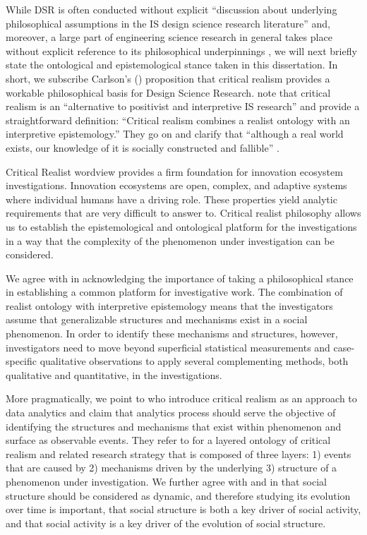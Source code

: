 While DSR is often conducted without explicit ``discussion about underlying philosophical assumptions in the IS design science research literature'' \cite{Carlsson2010DesignApproach} and, moreover, a large part of engineering science research in general takes place without explicit reference to its philosophical underpinnings \citep{Naukkarinen2015WhatFinland}, we will next briefly state the ontological and epistemological stance taken in this dissertation. In short, we subscribe  Carlson's (\citeyear{Carlsson2010DesignApproach}) proposition that critical realism provides a workable philosophical basis for Design Science Research. \cite{Bygstad2011InAnalysis} note that critical realism is an ``alternative to positivist and interpretive IS research'' and provide a straightforward definition: ``Critical realism combines a realist ontology  with an interpretive epistemology.'' They go on and clarify that ``although a real world exists, our knowledge of it is socially constructed and fallible'' \citep{Bygstad2011InAnalysis}.

Critical Realist wordview provides a firm foundation for innovation ecosystem investigations. Innovation ecosystems are open, complex, and adaptive systems \citep{Thomas2012ModelingLiteratures} where individual humans have a driving role. These properties yield analytic requirements that are very difficult to answer to. Critical realist philosophy allows us to establish the epistemological and ontological platform for the investigations in a way that the complexity of the phenomenon under investigation can be considered. 

We agree with \cite{Dobson2001TheResearch} in acknowledging the importance of taking a philosophical stance in establishing a common platform for investigative work. The combination of realist ontology with interpretive epistemology \citep{Bygstad2011InAnalysis} means that the investigators assume that generalizable structures and mechanisms exist in a social phenomenon. In order to identify these mechanisms and structures, however, investigators need to move beyond superficial statistical measurements and case-specific qualitative observations to apply several complementing methods, both qualitative and quantitative, in the investigations. 

More pragmatically, we point to \cite{Bygstad2011InAnalysis} who introduce critical realism as an approach to data analytics and claim that analytics process should serve the objective of identifying the structures and mechanisms that exist within phenomenon and surface as observable events. They refer to \cite{Sayer2010MethodApproach} for a layered ontology of critical realism and related research strategy that is composed of three layers: 1) events that are caused by 2) mechanisms driven by the underlying 3) structure of a phenomenon under investigation. We further agree with \cite{Dobson2001TheResearch} and \cite{Archer1995RealistApproach} in that social structure should be considered as dynamic, and therefore studying its evolution over time is important, that social structure is both a key driver of social activity, and that social activity is a key driver of the evolution of social structure. 

